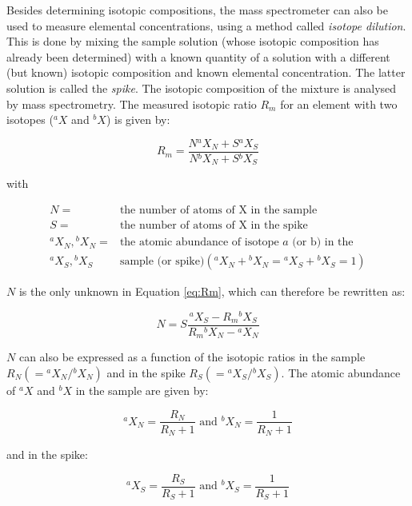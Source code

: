 \documentclass{book}
\begin{document}
Besides determining isotopic compositions, the mass spectrometer can
also be used to measure elemental concentrations, using a method
called \emph{isotope dilution}. This is done by mixing the sample
solution (whose isotopic composition has already been determined) with
a known quantity of a solution with a different (but known) isotopic
composition and known elemental concentration. The latter solution is
called the \emph{spike}.  The isotopic composition of the mixture is
analysed by mass spectrometry.  The measured isotopic ratio $R_m$ for
an element with two isotopes ($^aX$ and $^{b}X$) is given by:

\begin{equation}
R_m = \frac{N {}^aX_N + S {}^aX_S}{N {}^bX_N + S {}^bX_S}
\label{eq:Rm}
\end{equation}

with

\begin{equation*}
\begin{array}{rl}
N = & \mbox{the number of atoms of X in the sample}\\
S = & \mbox{the number of atoms of X in the spike}\\
^aX_N, {}^bX_N = & \mbox{the atomic abundance of isotope~} a \mbox{~(or b) in the~}\\
{}^aX_S, {}^bX_S ~~~ & \mbox{sample (or spike)} (^aX_N + {}^bX_N = {}^aX_S + {}^bX_S = 1)
\end{array}
\end{equation*}

$N$ is the only unknown in Equation \ref{eq:Rm}, which can therefore be
rewritten as:

\begin{equation}
N = S \frac{^aX_S - R_m {}^bX_S}{R_m {}^bX_N - {}^aX_N}
\label{eq:N}
\end{equation}

$N$ can also be expressed as a function of the isotopic ratios in the
sample $R_N (={}^aX_N/{}^bX_N)$ and in the spike $R_S
(={}^aX_S/{}^bX_S)$. The atomic abundance of $^aX$ and $^bX$ in the
sample are given by:

\begin{equation}
^aX_N = \frac{R_N}{R_N + 1} \mbox{~and~} {}^bX_N = \frac{1}{R_N + 1}
\label{eq:aXNbXN}
\end{equation}

and in the spike:

\begin{equation}
^aX_S = \frac{R_S}{R_S + 1} \mbox{~and~} {}^bX_S = \frac{1}{R_S + 1}
\label{eq:aXSbXS}
\end{equation}
\end{document}
